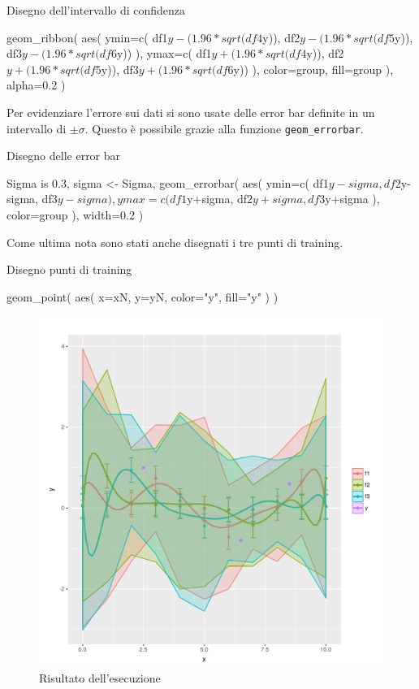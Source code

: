 \documentclass[10pt,titlepage,twoside,a4paper]{report}
\newenvironment{code}{\singlespacing\captionsetup{type=listing}}{}
\begin{document}
\begin{code}
\caption{Disegno dell'intervallo di confidenza}
\begin{rcode*}{}
geom_ribbon(
    aes(
        ymin=c(
            df1$y-(1.96*sqrt(df4$y)),
            df2$y-(1.96*sqrt(df5$y)),
            df3$y-(1.96*sqrt(df6$y))
        ),
        ymax=c(
            df1$y+(1.96*sqrt(df4$y)),
            df2$y+(1.96*sqrt(df5$y)),
            df3$y+(1.96*sqrt(df6$y))
        ),
        color=group,
        fill=group
    ),
    alpha=0.2
)
\end{rcode*}
\end{code}

Per evidenziare l'errore sui dati si sono usate delle error bar definite in un 
intervallo di $\pm \sigma$. Questo è possibile grazie alla funzione 
\texttt{geom\_errorbar}.

\begin{code}
\caption{Disegno delle error bar}
\begin{rcode*}{}
Sigma is 0.3,
sigma <- Sigma,
geom_errorbar(
    aes(
        ymin=c(
            df1$y-sigma,
            df2$y-sigma,
            df3$y-sigma
        ),
        ymax=c(
            df1$y+sigma,
            df2$y+sigma,
            df3$y+sigma
        ),
        color=group
    ),
    width=0.2
)
\end{rcode*}
\end{code}

Come ultima nota sono stati anche disegnati i tre punti di training.
\begin{code}
\caption{Disegno punti di training}
\begin{rcode*}{}
geom_point(
    aes(
        x=xN,
        y=yN,
        color="y",
        fill="y"
    )
)
\end{rcode*}
\end{code}

\begin{figure}[H]
\centering
\caption{Risultato dell'esecuzione}
\includegraphics[width=.5\linewidth]{gpr_R_plot.png}
\end{figure}
\end{document}
